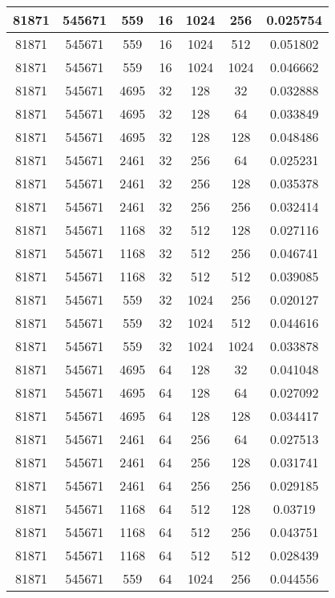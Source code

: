 \documentclass[9pt]{article}
\begin{document}
\begin{tabular}{|c|c|c|c|c|c|c| }
\hline
81871  & 545671  & 559  & 16  & 1024  & 256  & 0.025754 \\
\hline
81871  & 545671  & 559  & 16  & 1024  & 512  & 0.051802 \\
\hline
81871  & 545671  & 559  & 16  & 1024  & 1024  & 0.046662 \\
\hline
81871  & 545671  & 4695  & 32  & 128  & 32  & 0.032888 \\
\hline
81871  & 545671  & 4695  & 32  & 128  & 64  & 0.033849 \\
\hline
81871  & 545671  & 4695  & 32  & 128  & 128  & 0.048486 \\
\hline
81871  & 545671  & 2461  & 32  & 256  & 64  & 0.025231 \\
\hline
81871  & 545671  & 2461  & 32  & 256  & 128  & 0.035378 \\
\hline
81871  & 545671  & 2461  & 32  & 256  & 256  & 0.032414 \\
\hline
81871  & 545671  & 1168  & 32  & 512  & 128  & 0.027116 \\
\hline
81871  & 545671  & 1168  & 32  & 512  & 256  & 0.046741 \\
\hline
81871  & 545671  & 1168  & 32  & 512  & 512  & 0.039085 \\
\hline
81871  & 545671  & 559  & 32  & 1024  & 256  & 0.020127 \\
\hline
81871  & 545671  & 559  & 32  & 1024  & 512  & 0.044616 \\
\hline
81871  & 545671  & 559  & 32  & 1024  & 1024  & 0.033878 \\
\hline
81871  & 545671  & 4695  & 64  & 128  & 32  & 0.041048 \\
\hline
81871  & 545671  & 4695  & 64  & 128  & 64  & 0.027092 \\
\hline
81871  & 545671  & 4695  & 64  & 128  & 128  & 0.034417 \\
\hline
81871  & 545671  & 2461  & 64  & 256  & 64  & 0.027513 \\
\hline
81871  & 545671  & 2461  & 64  & 256  & 128  & 0.031741 \\
\hline
81871  & 545671  & 2461  & 64  & 256  & 256  & 0.029185 \\
\hline
81871  & 545671  & 1168  & 64  & 512  & 128  & 0.03719 \\
\hline
81871  & 545671  & 1168  & 64  & 512  & 256  & 0.043751 \\
\hline
81871  & 545671  & 1168  & 64  & 512  & 512  & 0.028439 \\
\hline
81871  & 545671  & 559  & 64  & 1024  & 256  & 0.044556 \\

\end{tabular}
\end{document}
